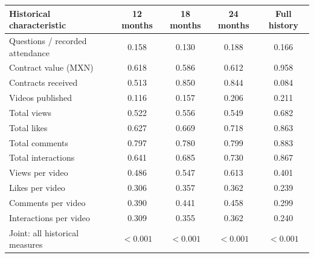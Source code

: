 \begingroup\small
\setlength{\tabcolsep}{3pt}
\renewcommand{\arraystretch}{1.25}
\noindent%
\begin{tabular*}{\linewidth}{@{\extracolsep{\fill}}lcccc@{}}
\toprule
Historical characteristic & 12 months & 18 months & 24 months & Full history \\
\midrule
Questions / recorded attendance & 0.158 & 0.130 & 0.188 & 0.166 \\
\addlinespace
Contract value (MXN) & 0.618 & 0.586 & 0.612 & 0.958 \\
Contracts received & 0.513 & 0.850 & 0.844 & 0.084 \\
\addlinespace
Videos published & 0.116 & 0.157 & 0.206 & 0.211 \\
Total views & 0.522 & 0.556 & 0.549 & 0.682 \\
Total likes & 0.627 & 0.669 & 0.718 & 0.863 \\
Total comments & 0.797 & 0.780 & 0.799 & 0.883 \\
Total interactions & 0.641 & 0.685 & 0.730 & 0.867 \\
Views per video & 0.486 & 0.547 & 0.613 & 0.401 \\
Likes per video & 0.306 & 0.357 & 0.362 & 0.239 \\
Comments per video & 0.390 & 0.441 & 0.458 & 0.299 \\
Interactions per video & 0.309 & 0.355 & 0.362 & 0.240 \\
\midrule
Joint: all historical measures & $<0.001$ & $<0.001$ & $<0.001$ & $<0.001$ \\
\bottomrule
\end{tabular*}\par\endgroup
